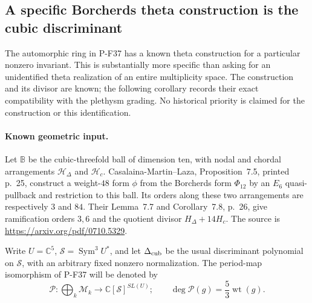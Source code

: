 \subsection{A specific Borcherds theta construction is the cubic discriminant}

The automorphic ring in P-F37 has a known theta construction for a
particular nonzero invariant. This is substantially more specific than
asking for an unidentified theta realization of an entire multiplicity
space. The construction and its divisor are known; the following
corollary records their exact compatibility with the plethysm grading.
No historical priority is claimed for the construction or this
identification.

\paragraph{Known geometric input.}
Let $\mathbb B$ be the cubic-threefold ball of dimension ten, with
nodal and chordal arrangements $\mathcal H_\Delta$ and $\mathcal H_c$.
Casalaina-Martin--Laza, Proposition~7.5, printed p.~25,
construct a weight-$48$ form $\phi$ from the Borcherds form
$\Phi_{12}$ by an $E_6$ quasi-pullback and restriction to this ball.
Its orders along these two arrangements are respectively $3$ and $84$.
Their Lemma~7.7 and Corollary~7.8, p.~26, give ramification
orders $3,6$ and the quotient divisor $H_\Delta+14H_c$.
The source is \url{https://arxiv.org/pdf/0710.5329}.

Write $U=\mathbb C^5$, $\mathscr S=\operatorname{Sym}^3U^*$,
and let $\Delta_{\rm cub}$ be the usual discriminant polynomial
on $\mathscr S$, with an arbitrary fixed nonzero normalization.
The period-map isomorphism of P-F37 will be denoted by
\[
 \mathcal P:\bigoplus_k\mathcal M_k
       \longrightarrow \mathbb C[\mathscr S]^{SL(U)};
 \qquad\deg\mathcal P(g)=\frac53\operatorname{wt}(g).
 \tag{P-F41a}
\]

